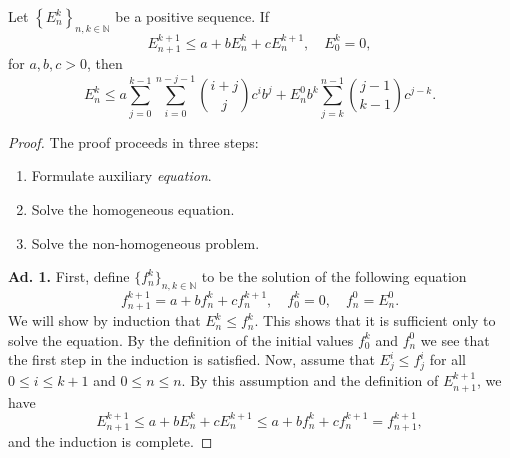 \documentclass[10pt,a4paper]{amsart}
\begin{document}
\begin{lem}\label{lem:Gronwall}
	Let $\left\{E^k_n\right\}_{n,k \in \mathbb{N}}$ be a positive sequence. If
	\begin{equation}
		E^{k+1}_{n+1} \leq a + b E^k_n + c E^{k+1}_{n}, \quad E^k_0 = 0, 
	\end{equation}
	for $a,b,c > 0$, then
	\begin{equation}\label{eqn:LemmaInequality}
		E^k_n \leq a \sum_{j=0}^{k-1} \sum_{i=0}^{n-j-1} \binom{i+j}{j} c^i b^j + E^0_n b^k \sum_{j=k}^{n-1} \binom{j-1}{k-1} c^{j-k}.
	\end{equation}
\end{lem}

\begin{proof}
	The proof proceeds in three steps:
	\begin{enumerate}
		\item Formulate auxiliary \emph{equation}.
		\item Solve the homogeneous equation.
		\item Solve the non-homogeneous problem.
	\end{enumerate}
	\medskip\noindent\textbf{Ad. 1.} First, define $\{f^k_n\}_{n,k\in\mathbb{N}}$ to be the solution of the following equation
	\begin{equation}
		f^{k+1}_{n+1} = a + b f^k_n + c f^{k+1}_{n}, \quad f^k_0 = 0, \quad f^0_n = E^0_n.
	\end{equation}
	We will show by induction that $E^k_n \leq f^k_n$. This shows that it is sufficient only to solve the equation. By the definition of the initial values $f_0^k$ and $f^0_n$ we see that the first step in the induction is satisfied. Now, assume that $E^i_j \leq f^i_j$ for all $0\leq i \leq k+1$ and $0\leq n \leq n$. By this assumption and the definition of $E^{k+1}_{n+1}$, we have
	\begin{equation}
		E^{k+1}_{n+1} \leq a + b E^k_n + c E^{k+1}_n \leq a + b f^{k}_n + c f^{k+1}_n = f^{k+1}_{n+1}, 
	\end{equation}
	and the induction is complete. 
	

\end{proof}
\end{document}
